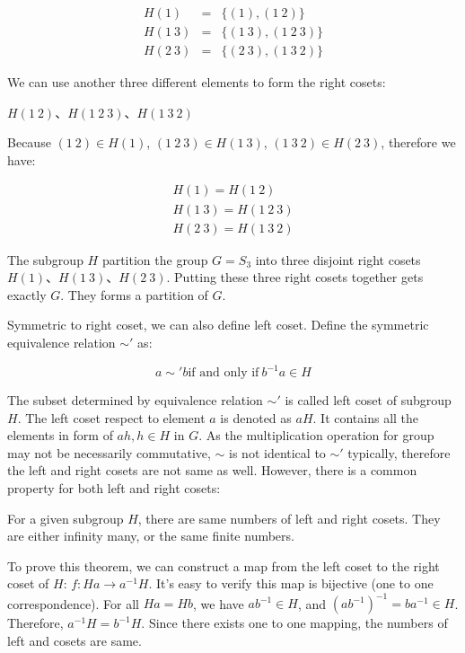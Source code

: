 \documentclass{article}
\begin{document}
\[
\begin{array}{rcl}
H(1) & = & \{(1), (1\ 2)\} \\
H(1\ 3) & = & \{(1\ 3), (1\ 2\ 3)\} \\
H(2\ 3) & = & \{(2\ 3), (1\ 3\ 2)\}
\end{array}
\]

We can use another three different elements to form the right cosets:

$H(1\ 2)$、$H(1\ 2\ 3)$、$H(1\ 3\ 2)$

Because $(1\ 2) \in H(1)$, $(1\ 2\ 3) \in H(1\ 3)$, $(1\ 3\ 2) \in H(2\ 3)$, therefore we have:

\[
\begin{array}{l}
H(1) = H(1\ 2) \\
H(1\ 3) = H(1\ 2\ 3) \\
H(2\ 3) = H(1\ 3\ 2)
\end{array}
\]

The subgroup $H$ partition the group $G = S_3$ into three disjoint right cosets $H(1)$、$H(1\ 3)$、$H(2\ 3)$. Putting these three right cosets together gets exactly $G$. They forms a partition of $G$.

Symmetric to right coset, we can also define left coset. Define the symmetric equivalence relation $\sim'$ as:

\[
a \sim' b \text{if and only if}\ b^{-1}a \in H
\]

The subset determined by equivalence relation $\sim'$ is called left coset of subgroup $H$. The left coset respect to element $a$ is denoted as $aH$. It contains all the elements in form of $ah, h \in H$ in $G$. As the multiplication operation for group may not be necessarily commutative, $\sim$ is not identical to $\sim'$ typically, therefore the left and right cosets are not same as well. However, there is a common property for both left and right cosets:

\begin{theorem}
For a given subgroup $H$, there are same numbers of left and right cosets. They are either infinity many, or the same finite numbers.
\end{theorem}

To prove this theorem, we can construct a map from the left coset to the right coset of $H$: $f: Ha \to a^{-1}H$. It's easy to verify this map is bijective (one to one correspondence). For all $Ha = Hb$, we have $ab^{-1} \in H$, and $(ab^{-1})^{-1} = ba^{-1} \in H$. Therefore, $a^{-1}H= b^{-1}H$. Since there exists one to one mapping, the numbers of left and cosets are same.
\end{document}
